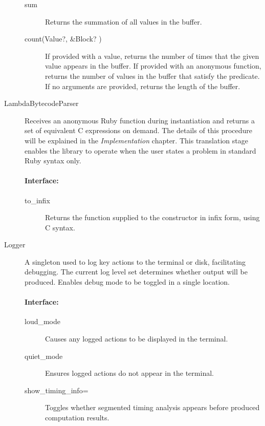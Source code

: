\begin{description}
\begin{description}
  \item[sum] Returns the summation of all values in the buffer.

  \item[count(Value?, \&Block? )] If provided with a value, returns the number of times that the given value appears in the buffer. If provided with an anonymous function, returns the number of values in the buffer that satisfy the predicate. If no arguments are provided, returns the length of the buffer.
\end{description}

\item[LambdaBytecodeParser]
Receives an anonymous Ruby function during instantiation and returns a set of equivalent C expressions on demand. The details of this procedure will be explained in the \emph{Implementation} chapter. This translation stage enables the library to operate when the user states a problem in standard Ruby syntax only.

\paragraph*{Interface:}
\begin{description}
  \item[to\_infix] Returns the function supplied to the constructor in infix form, using C syntax.
\end{description}

\item[Logger]
A singleton used to log key actions to the terminal or disk, facilitating debugging. The current log level set determines whether output will be produced. Enables debug mode to be toggled in a single location.

\paragraph*{Interface:}
\begin{description}
  \item[loud\_mode] Causes any logged actions to be displayed in the terminal.

  \item[quiet\_mode] Ensures logged actions do not appear in the terminal.

  \item[show\_timing\_info=] Toggles whether segmented timing analysis appears before produced computation results.
\end{description}


\end{description}
